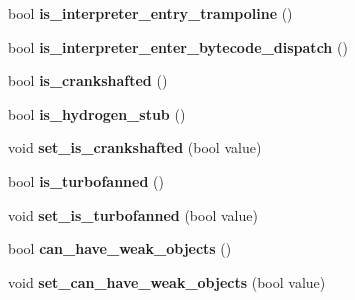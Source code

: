 \begin{DoxyCompactItemize}
\item 
bool {\bfseries is\+\_\+interpreter\+\_\+entry\+\_\+trampoline} ()\hypertarget{classv8_1_1internal_1_1_code_af6198355f34be1d98c7089a47a9bd1b8}{}\label{classv8_1_1internal_1_1_code_af6198355f34be1d98c7089a47a9bd1b8}

\item 
bool {\bfseries is\+\_\+interpreter\+\_\+enter\+\_\+bytecode\+\_\+dispatch} ()\hypertarget{classv8_1_1internal_1_1_code_a860fd2126cf4bb6ec0d1636c2a8451d3}{}\label{classv8_1_1internal_1_1_code_a860fd2126cf4bb6ec0d1636c2a8451d3}

\item 
bool {\bfseries is\+\_\+crankshafted} ()\hypertarget{classv8_1_1internal_1_1_code_ab4a2f17928fc93c6e76e17c07cf212e1}{}\label{classv8_1_1internal_1_1_code_ab4a2f17928fc93c6e76e17c07cf212e1}

\item 
bool {\bfseries is\+\_\+hydrogen\+\_\+stub} ()\hypertarget{classv8_1_1internal_1_1_code_ae2a6962a1fa9eb5f18831eddbb8009ab}{}\label{classv8_1_1internal_1_1_code_ae2a6962a1fa9eb5f18831eddbb8009ab}

\item 
void {\bfseries set\+\_\+is\+\_\+crankshafted} (bool value)\hypertarget{classv8_1_1internal_1_1_code_aae0224409dee97755ba3c34da113460b}{}\label{classv8_1_1internal_1_1_code_aae0224409dee97755ba3c34da113460b}

\item 
bool {\bfseries is\+\_\+turbofanned} ()\hypertarget{classv8_1_1internal_1_1_code_a1f72676b62785515ee109814b7317789}{}\label{classv8_1_1internal_1_1_code_a1f72676b62785515ee109814b7317789}

\item 
void {\bfseries set\+\_\+is\+\_\+turbofanned} (bool value)\hypertarget{classv8_1_1internal_1_1_code_aeb6d94da8edb5b58c72aa8c9f4027767}{}\label{classv8_1_1internal_1_1_code_aeb6d94da8edb5b58c72aa8c9f4027767}

\item 
bool {\bfseries can\+\_\+have\+\_\+weak\+\_\+objects} ()\hypertarget{classv8_1_1internal_1_1_code_aeaaa60a05876e8dcb853d8e508ec7c69}{}\label{classv8_1_1internal_1_1_code_aeaaa60a05876e8dcb853d8e508ec7c69}

\item 
void {\bfseries set\+\_\+can\+\_\+have\+\_\+weak\+\_\+objects} (bool value)\hypertarget{classv8_1_1internal_1_1_code_af4c44e0a44573d0b8ff384bd89458052}{}\label{classv8_1_1internal_1_1_code_af4c44e0a44573d0b8ff384bd89458052}


\end{DoxyCompactItemize}
